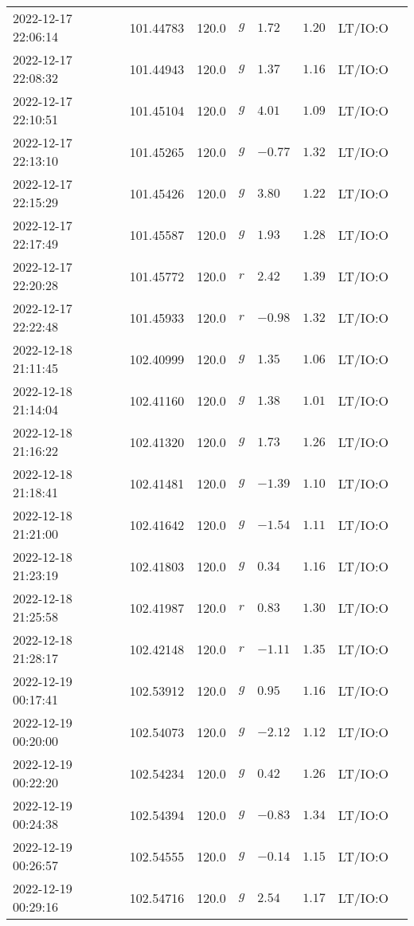 \documentclass{nature_plusfigure}
\begin{document}
\begin{supplement}
\begin{center}
\begin{longtable}{llllllll}
2022-12-17 22:06:14 & 101.44783 & 120.0 & $g$ & $1.72$ & $1.20$ & LT/IO:O &  \\ 
2022-12-17 22:08:32 & 101.44943 & 120.0 & $g$ & $1.37$ & $1.16$ & LT/IO:O &  \\ 
2022-12-17 22:10:51 & 101.45104 & 120.0 & $g$ & $4.01$ & $1.09$ & LT/IO:O &  \\ 
2022-12-17 22:13:10 & 101.45265 & 120.0 & $g$ & $-0.77$ & $1.32$ & LT/IO:O &  \\ 
2022-12-17 22:15:29 & 101.45426 & 120.0 & $g$ & $3.80$ & $1.22$ & LT/IO:O &  \\ 
2022-12-17 22:17:49 & 101.45587 & 120.0 & $g$ & $1.93$ & $1.28$ & LT/IO:O &  \\ 
2022-12-17 22:20:28 & 101.45772 & 120.0 & $r$ & $2.42$ & $1.39$ & LT/IO:O &  \\ 
2022-12-17 22:22:48 & 101.45933 & 120.0 & $r$ & $-0.98$ & $1.32$ & LT/IO:O &  \\ 
2022-12-18 21:11:45 & 102.40999 & 120.0 & $g$ & $1.35$ & $1.06$ & LT/IO:O &  \\ 
2022-12-18 21:14:04 & 102.41160 & 120.0 & $g$ & $1.38$ & $1.01$ & LT/IO:O &  \\ 
2022-12-18 21:16:22 & 102.41320 & 120.0 & $g$ & $1.73$ & $1.26$ & LT/IO:O &  \\ 
2022-12-18 21:18:41 & 102.41481 & 120.0 & $g$ & $-1.39$ & $1.10$ & LT/IO:O &  \\ 
2022-12-18 21:21:00 & 102.41642 & 120.0 & $g$ & $-1.54$ & $1.11$ & LT/IO:O &  \\ 
2022-12-18 21:23:19 & 102.41803 & 120.0 & $g$ & $0.34$ & $1.16$ & LT/IO:O &  \\ 
2022-12-18 21:25:58 & 102.41987 & 120.0 & $r$ & $0.83$ & $1.30$ & LT/IO:O &  \\ 
2022-12-18 21:28:17 & 102.42148 & 120.0 & $r$ & $-1.11$ & $1.35$ & LT/IO:O &  \\ 
2022-12-19 00:17:41 & 102.53912 & 120.0 & $g$ & $0.95$ & $1.16$ & LT/IO:O &  \\ 
2022-12-19 00:20:00 & 102.54073 & 120.0 & $g$ & $-2.12$ & $1.12$ & LT/IO:O &  \\ 
2022-12-19 00:22:20 & 102.54234 & 120.0 & $g$ & $0.42$ & $1.26$ & LT/IO:O &  \\ 
2022-12-19 00:24:38 & 102.54394 & 120.0 & $g$ & $-0.83$ & $1.34$ & LT/IO:O &  \\ 
2022-12-19 00:26:57 & 102.54555 & 120.0 & $g$ & $-0.14$ & $1.15$ & LT/IO:O &  \\ 
2022-12-19 00:29:16 & 102.54716 & 120.0 & $g$ & $2.54$ & $1.17$ & LT/IO:O &  \\ 

\end{longtable}
\end{center}
\end{supplement}
\end{document}
